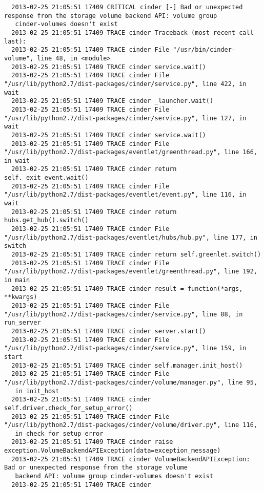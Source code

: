 \begin{lstlisting}
  2013-02-25 21:05:51 17409 CRITICAL cinder [-] Bad or unexpected response from the storage volume backend API: volume group
   cinder-volumes doesn't exist
  2013-02-25 21:05:51 17409 TRACE cinder Traceback (most recent call last):
  2013-02-25 21:05:51 17409 TRACE cinder File "/usr/bin/cinder-volume", line 48, in <module>
  2013-02-25 21:05:51 17409 TRACE cinder service.wait()
  2013-02-25 21:05:51 17409 TRACE cinder File "/usr/lib/python2.7/dist-packages/cinder/service.py", line 422, in wait
  2013-02-25 21:05:51 17409 TRACE cinder _launcher.wait()
  2013-02-25 21:05:51 17409 TRACE cinder File "/usr/lib/python2.7/dist-packages/cinder/service.py", line 127, in wait
  2013-02-25 21:05:51 17409 TRACE cinder service.wait()
  2013-02-25 21:05:51 17409 TRACE cinder File "/usr/lib/python2.7/dist-packages/eventlet/greenthread.py", line 166, in wait
  2013-02-25 21:05:51 17409 TRACE cinder return self._exit_event.wait()
  2013-02-25 21:05:51 17409 TRACE cinder File "/usr/lib/python2.7/dist-packages/eventlet/event.py", line 116, in wait
  2013-02-25 21:05:51 17409 TRACE cinder return hubs.get_hub().switch()
  2013-02-25 21:05:51 17409 TRACE cinder File "/usr/lib/python2.7/dist-packages/eventlet/hubs/hub.py", line 177, in switch
  2013-02-25 21:05:51 17409 TRACE cinder return self.greenlet.switch()
  2013-02-25 21:05:51 17409 TRACE cinder File "/usr/lib/python2.7/dist-packages/eventlet/greenthread.py", line 192, in main
  2013-02-25 21:05:51 17409 TRACE cinder result = function(*args, **kwargs)
  2013-02-25 21:05:51 17409 TRACE cinder File "/usr/lib/python2.7/dist-packages/cinder/service.py", line 88, in run_server
  2013-02-25 21:05:51 17409 TRACE cinder server.start()
  2013-02-25 21:05:51 17409 TRACE cinder File "/usr/lib/python2.7/dist-packages/cinder/service.py", line 159, in start
  2013-02-25 21:05:51 17409 TRACE cinder self.manager.init_host()
  2013-02-25 21:05:51 17409 TRACE cinder File "/usr/lib/python2.7/dist-packages/cinder/volume/manager.py", line 95,
   in init_host
  2013-02-25 21:05:51 17409 TRACE cinder self.driver.check_for_setup_error()
  2013-02-25 21:05:51 17409 TRACE cinder File "/usr/lib/python2.7/dist-packages/cinder/volume/driver.py", line 116,
   in check_for_setup_error
  2013-02-25 21:05:51 17409 TRACE cinder raise exception.VolumeBackendAPIException(data=exception_message)
  2013-02-25 21:05:51 17409 TRACE cinder VolumeBackendAPIException: Bad or unexpected response from the storage volume
   backend API: volume group cinder-volumes doesn't exist
  2013-02-25 21:05:51 17409 TRACE cinder
\end{lstlisting}

